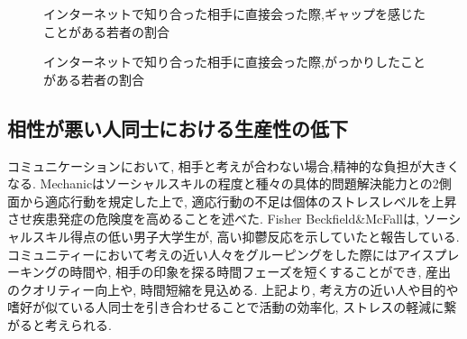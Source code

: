 \begin{figure}[htbp]
    \begin{center}
    \end{center}
    \caption{インターネットで知り合った相手に直接会った際,ギャップを感じたことがある若者の割合}
    \label{fig:onlinemeeting_to_real}
\end{figure}

\begin{figure}[htbp]
    \begin{center}
    \end{center}
    \caption{インターネットで知り合った相手に直接会った際,がっかりしたことがある若者の割合}
    \label{fig:onlinemeeting_to_real}
\end{figure}


\subsection{相性が悪い人同士における生産性の低下}
コミュニケーションにおいて, 相手と考えが合わない場合,精神的な負担が大きくなる.
Mechanicはソーシャルスキルの程度と種々の具体的問題解決能力との2側面から適応行動を規定した上で,
適応行動の不足は個体のストレスレベルを上昇させ疾患発症の危険度を高めることを述べた.\cite{Mechanic}
Fisher Beckfield\&McFallは, ソーシャルスキル得点の低い男子大学生が,
高い抑鬱反応を示していたと報告している.\cite{FisherMcFall}
コミュニティーにおいて考えの近い人々をグルーピングをした際にはアイスプレーキングの時間や,
相手の印象を探る時間フェーズを短くすることができ, 産出のクオリティー向上や, 時間短縮を見込める.
上記より, 考え方の近い人や目的や嗜好が似ている人同士を引き合わせることで活動の効率化,
ストレスの軽減に繋がると考えられる.


